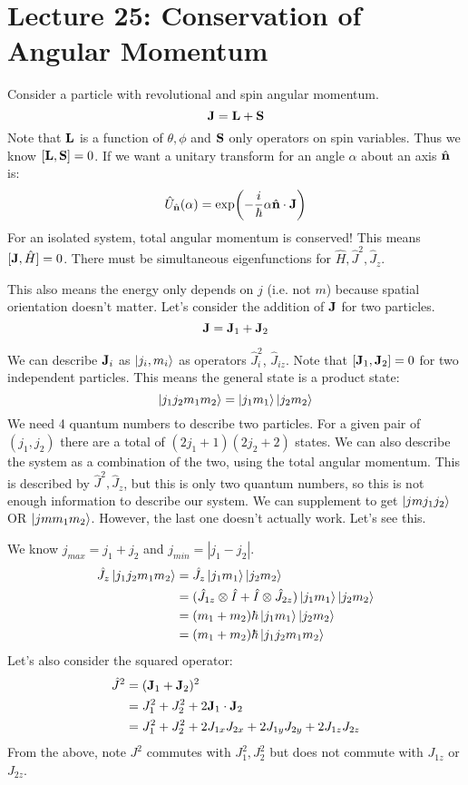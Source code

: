 \section{Lecture 25: Conservation of Angular Momentum} 

Consider a particle with revolutional and spin angular momentum.
\[ \mathbf{J} = \mathbf{L} + \mathbf{S} \]
Note that $\mathbf{L}$ is a function of $\theta, \phi$ and $\mathbf{S}$ only operators on spin variables. Thus we know $[\mathbf{L}, \mathbf{S}] = 0$.
If we want a unitary transform for an angle $\alpha$ about an axis $\hat{\mathbf{n}}$ is:
\[ \hat{U}_{\hat{\mathbf{n}}}(\alpha) = \exp(-\frac{i}{\hbar} \alpha \hat{\mathbf{n}} \cdot \mathbf{J}) \]
For an isolated system, total angular momentum is conserved! This means $[\mathbf{J}, \hat{H}] = 0$. There must be
simultaneous eigenfunctions for $\hat{H}, \hat{J}^2, \hat{J}_z$.

This also means the energy only depends on $j$ (i.e. not $m$) because spatial orientation doesn't matter. Let's consider the addition of
$\mathbf{J}$ for two particles.
\[ \mathbf{J} = \mathbf{J}_1 + \mathbf{J}_2 \]

We can describe $\mathbf{J}_i$ as $\ket{j_i, m_i}$ as operators $\hat{J}^2_i$, $\hat{J}_{iz}$. Note that $[\mathbf{J}_1, \mathbf{J}_2] = 0 $ for two independent particles.
This means the general state is a product state:
\[ \ket{j_1 j_2 m_1 m_2} = \ket{j_1 m_1} \ket{j_2 m_2} \]
We need 4 quantum numbers to describe two particles. For a given pair of $(j_1, j_2)$ there are a total of $(2j_1 + 1)(2j_2 + 2)$ states. We
can also describe the system as a combination of the two, using the total angular momentum. This is described by $\hat{J}^2, \hat{J}_z$, but this is only two
quantum numbers, so this is not enough information to describe our system. We can supplement to get $\ket{j m j_1 j_2}$ OR $\ket{j m m_1 m_2}$. However,
the last one doesn't actually work. Let's see this.

We know $j_{max} = j_1 + j_2$ and $j_{min} = |j_1 - j_2|$.
\begin{align*}
    \hat{J}_z \ket{j_1 j_2 m_1 m_2} &= \hat{J}_z \ket{j_1 m_1} \ket{j_2 m_2} \\
    &= (\hat{J}_{1z} \otimes \hat{I} + \hat{I} \otimes \hat{J}_{2z}) \ket{j_1 m_1} \ket{j_2 m_2}\\
    &= (m_1 + m_2)\hbar \ket{j_1 m_1} \ket{j_2 m_2} \\
    &= (m_1 + m_2)\hbar \ket{j_1 j_2 m_1 m_2}
\end{align*}
Let's also consider the squared operator:
\begin{align*}
    \hat{J}^2 &= (\mathbf{J}_1 + \mathbf{J}_2)^2 \\
    &= J_1^2 + J_2^2 + 2 \mathbf{J}_1 \cdot \mathbf{J}_2 \\
    &= J_1^2 + J_2^2 + 2J_{1x}J_{2x} + 2 J_{1y} J_{2y} + 2 J_{1z} J_{2z}
\end{align*}
From the above, note $J^2$ commutes with $J_1^2, J_2^2$ but does not commute with $J_{1z}$ or $J_{2z}$.

